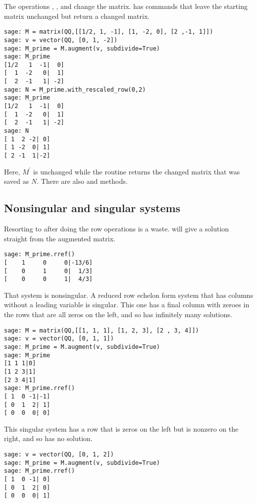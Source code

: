 The operations ,
, and 
change the matrix.
\Sage{} has commands that leave the starting matrix unchanged but
return a changed matrix.
\begin{lstlisting}[style=python]
sage: M = matrix(QQ,[[1/2, 1, -1], [1, -2, 0], [2 ,-1, 1]])
sage: v = vector(QQ, [0, 1, -2])
sage: M_prime = M.augment(v, subdivide=True) 
sage: M_prime
[1/2   1  -1|  0]
[  1  -2   0|  1]
[  2  -1   1| -2]
sage: N = M_prime.with_rescaled_row(0,2)
sage: M_prime
[1/2   1  -1|  0]
[  1  -2   0|  1]
[  2  -1   1| -2]
sage: N      
[ 1  2 -2| 0]
[ 1 -2  0| 1]
[ 2 -1  1|-2]  
\end{lstlisting}
Here, $M^\prime$ is unchanged while the routine returns the
changed matrix that was saved as $N$.
There are also  
and  methods.




\subsection{Nonsingular and singular systems}
Resorting to  after doing the row operations is a waste.
\Sage{} will give a solution straight from the augmented matrix.
\begin{lstlisting}[style=python]
sage: M_prime.rref()
[    1     0     0|-13/6]
[    0     1     0|  1/3]
[    0     0     1|  4/3]
\end{lstlisting}

That system is nonsingular.
A reduced row echelon form system that has columns without a leading variable
is singular.
This one has a final column with zeroes in the rows that are all zeros on the
left, and so has infinitely many solutions.
\begin{lstlisting}[style=python]
sage: M = matrix(QQ,[[1, 1, 1], [1, 2, 3], [2 , 3, 4]])    
sage: v = vector(QQ, [0, 1, 1]) 
sage: M_prime = M.augment(v, subdivide=True)
sage: M_prime
[1 1 1|0]
[1 2 3|1]
[2 3 4|1]
sage: M_prime.rref()
[ 1  0 -1|-1]
[ 0  1  2| 1]
[ 0  0  0| 0]  
\end{lstlisting}
 
This singular system has a row that is zeros on the left but is nonzero
on the right, and so has no solution.
\begin{lstlisting}[style=python]
sage: v = vector(QQ, [0, 1, 2])             
sage: M_prime = M.augment(v, subdivide=True)
sage: M_prime.rref()                        
[ 1  0 -1| 0]
[ 0  1  2| 0]
[ 0  0  0| 1]
\end{lstlisting}

